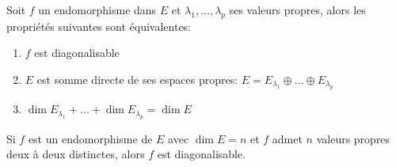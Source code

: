 \begin{theorem}
    Soit $f$ un endomorphisme dans  $E$ et  $\lambda_1, \ldots, \lambda_p$ ses valeurs propres, alors les propriétés suivantes sont équivalentes:
    \begin{enumerate}
        \item $f$ est diagonalisable
        \item  $E$ est somme directe de ses espaces propres:  $E = E_{\lambda_1} \oplus \ldots \oplus E_{\lambda_p}$
        \item $\dim E_{\lambda_1} + \ldots + \dim E_{\lambda_p} = \dim E$
    \end{enumerate}
\end{theorem}
\begin{corollary}
   Si $f$ est un endomorphisme de  $E$ avec  $\dim E = n$ et  $f$ admet  $n$ valeurs propres  deux à deux distinctes, alors $f$ est diagonalisable.
\end{corollary}


%
%
%
%
%
%
%
